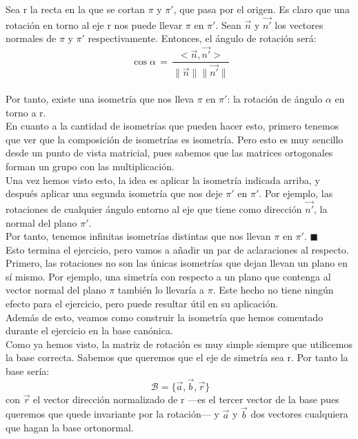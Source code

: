 \documentclass[10pt,a4paper]{article}
\theoremstyle{mystyle}
\begin{document}
Sea r la recta en la que se cortan $\pi$ y $\pi '$, que pasa por el origen. Es claro que una rotación en torno al eje r nos puede llevar $\pi$ en $\pi '$. Sean $\vec{n}$ y $\vec{n'}$ los vectores normales de $\pi$ y $\pi '$ respectivamente. Entonces, el ángulo de rotación será:\\

\[
\ \cos \alpha \, = \, \dfrac{<\vec{n},\vec{n'}>}{\|\vec{n}\|\|\vec{n'}\|}
\]\\

Por tanto, existe una isometría que nos lleva $\pi$ en $\pi '$: la rotación de ángulo $\alpha$ en torno a r.\\

En cuanto a la cantidad de isometrías que pueden hacer esto, primero tenemos que ver que la composición de isometrías es isometría. Pero esto es muy sencillo desde un punto de vista matricial, pues sabemos que las matrices ortogonales forman un grupo con las multiplicación.\\

Una vez hemos visto esto, la idea es aplicar la isometría indicada arriba, y después aplicar una segunda isometría que nos deje $\pi '$ en $\pi '$. Por ejemplo, las rotaciones de cualquier ángulo entorno al eje que tiene como dirección $\vec{n'}$, la normal del plano $\pi '$.\\

Por tanto, tenemos infinitas isometrías distintas que nos llevan $\pi$ en $\pi '$. $\blacksquare$\\

Esto termina el ejercicio, pero vamos a añadir un par de aclaraciones al respecto.\\

Primero, las rotaciones no son las únicas isometrías que dejan llevan un plano en sí mismo. Por ejemplo, una simetría con respecto a un plano que contenga al vector normal del plano $\pi$ también lo llevaría a $\pi$. Este hecho no tiene ningún efecto para el ejercicio, pero puede resultar útil en su aplicación.\\

Además de esto, veamos como construir la isometría que hemos comentado durante el ejercicio en la base canónica.\\

Como ya hemos visto, la matriz de rotación es muy simple siempre que utilicemos la base correcta. Sabemos que queremos que el eje de simetría sea r. Por tanto la base sería: 
\[
\ \mathcal{B} = \{\vec{a},\vec{b},\vec{r}\}
\]
con $\vec{r}$ el vector dirección normalizado de r ---es el tercer vector de la base pues queremos que quede invariante por la rotación--- y $\vec{a}$ y $\vec{b}$ dos vectores cualquiera que hagan la base ortonormal.\\
\end{document}
